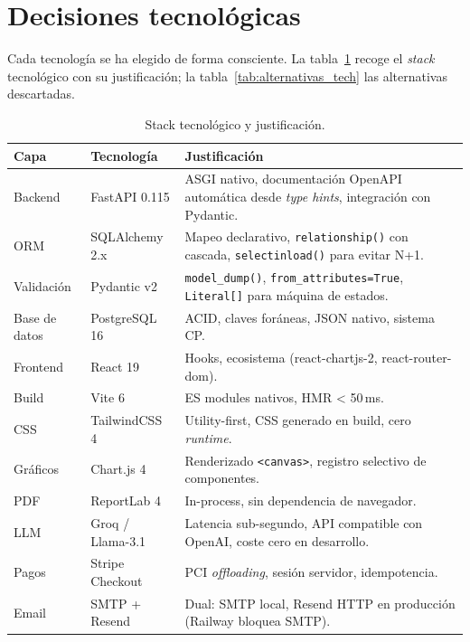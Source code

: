 \documentclass[12pt,twoside,titlepage]{report}
\begin{document}
\section{Decisiones tecnológicas}

Cada tecnología se ha elegido de forma consciente. La tabla~\ref{tab:stack} recoge el \emph{stack} tecnológico con su justificación; la tabla~\ref{tab:alternativas_tech} las alternativas descartadas.

\begin{table}[H]
  \centering
  \caption{Stack tecnológico y justificación.}
  \label{tab:stack}
  \begin{tabularx}{\textwidth}{llX}
    \toprule
    \textbf{Capa} & \textbf{Tecnología} & \textbf{Justificación} \\
    \midrule
    Backend        & FastAPI 0.115 \cite{fastapi}     & ASGI nativo, documentación OpenAPI automática desde \emph{type hints}, integración con Pydantic. \\
    ORM            & SQLAlchemy 2.x \cite{sqlalchemy}  & Mapeo declarativo, \texttt{relationship()} con cascada, \texttt{selectinload()} para evitar N+1. \\
    Validación     & Pydantic v2 \cite{pydantic}       & \texttt{model\_dump()}, \texttt{from\_attributes=True}, \texttt{Literal[]} para máquina de estados. \\
    Base de datos  & PostgreSQL 16 \cite{postgresql}   & ACID, claves foráneas, JSON nativo, sistema CP. \\
    Frontend       & React 19 \cite{react}             & Hooks, ecosistema (react-chartjs-2, react-router-dom). \\
    Build          & Vite 6 \cite{vite}                & ES modules nativos, HMR < 50\,ms. \\
    CSS            & TailwindCSS 4 \cite{tailwindcss}  & Utility-first, CSS generado en build, cero \emph{runtime}. \\
    Gráficos       & Chart.js 4 \cite{chartjs}         & Renderizado \texttt{<canvas>}, registro selectivo de componentes. \\
    PDF            & ReportLab 4 \cite{reportlab}      & In-process, sin dependencia de navegador. \\
    LLM            & Groq / Llama-3.1 \cite{groq}      & Latencia sub-segundo, API compatible con OpenAI, coste cero en desarrollo. \\
    Pagos          & Stripe Checkout \cite{stripe}     & PCI \emph{offloading}, sesión servidor, idempotencia. \\
    Email          & SMTP + Resend \cite{resend}       & Dual: SMTP local, Resend HTTP en producción (Railway bloquea SMTP). \\
    \bottomrule
  \end{tabularx}
\end{table}
\end{document}
